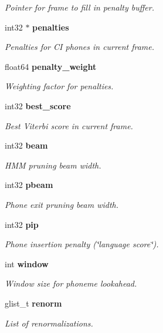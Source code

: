 \begin{DoxyCompactItemize}
\begin{DoxyCompactList}\small\item\em Pointer for frame to fill in penalty buffer. \end{DoxyCompactList}\item 
int32 $\ast$ {\bf penalties}\label{structphone__loop__search__s_a0d01d1eabc94239673b4040e2a6d84fd}

\begin{DoxyCompactList}\small\item\em Penalties for C\+I phones in current frame. \end{DoxyCompactList}\item 
float64 {\bf penalty\+\_\+weight}\label{structphone__loop__search__s_adecb101bb21afd9e2a32c3f59b5abdc7}

\begin{DoxyCompactList}\small\item\em Weighting factor for penalties. \end{DoxyCompactList}\item 
int32 {\bf best\+\_\+score}
\begin{DoxyCompactList}\small\item\em Best Viterbi score in current frame. \end{DoxyCompactList}\item 
int32 {\bf beam}
\begin{DoxyCompactList}\small\item\em H\+M\+M pruning beam width. \end{DoxyCompactList}\item 
int32 {\bf pbeam}
\begin{DoxyCompactList}\small\item\em Phone exit pruning beam width. \end{DoxyCompactList}\item 
int32 {\bf pip}
\begin{DoxyCompactList}\small\item\em Phone insertion penalty (\char`\"{}language score\char`\"{}). \end{DoxyCompactList}\item 
int {\bf window}\label{structphone__loop__search__s_a28788511ed4729a50c1b475312c7b90a}

\begin{DoxyCompactList}\small\item\em Window size for phoneme lookahead. \end{DoxyCompactList}\item 
glist\+\_\+t {\bf renorm}
\begin{DoxyCompactList}\small\item\em List of renormalizations. \end{DoxyCompactList}\end{DoxyCompactItemize}


